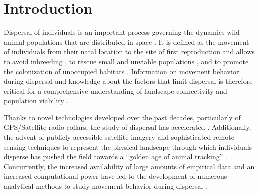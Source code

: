 \documentclass[abstract=on,10pt,a4paper,bibliography=totocnumbered]{article}
\begin{document}
\newpage



\section{Introduction}
Dispersal of individuals is an important process governing the dynamics wild
animal populations that are distributed in space \citep{Clobert.2012}. It is
defined as the movement of individuals from their natal location to the site of
first reproduction \cite{Howard.1960} and allows to avoid inbreeding
\citep{Perrin.1999, Perrin.2000, Frankham.2002, Leigh.2012}, to rescue small and
unviable populations \citep{Brown.1977}, and to promote the colonization of
unoccupied habitats \citep{Hanski.1998, MacArthur.2001}. Information on movement
behavior during dispersal and knowledge about the factors that limit dispersal
is therefore critical for a comprehensive understanding of landscape
connectivity and population viability \citep{Baguette.2013, Vasudev.2015}.

Thanks to novel technologies developed over the past decades, particularly of
GPS/Satellite radio-collars, the study of dispersal has accelerated
\citep{Jonsson.2016, Williams.2019}. Additionally, the advent of publicly
accessible satellite imagery and sophisticated remote sensing techniques to
represent the physical landscape through which individuals disperse has pushed
the field towards a  ``golden age of animal tracking'' \citep{Kays.2015}.
Concurrently, the increased availability of large amounts of empirical data and
an increased computational power have led to the development of numerous
analytical methods to study movement behavior during dispersal
\citep{Boyce.2002, Fortin.2005, Cushman.2010, Zeller.2012, Elliot.2014,
Diniz.2019}.
\end{document}
